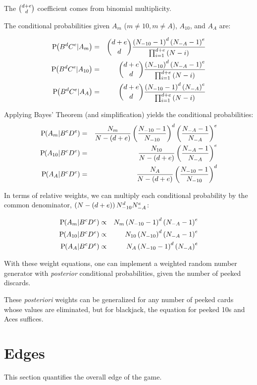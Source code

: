 \noindent
The $\binom{d+e}{d}$ coefficient comes from binomial multiplicity.

\noindent
The conditional probabilities given $A_m$ ($m\neq{}10,m\neq{}A$), 
$A_{10}$, and $A_A$ are:

\begin{eqnarray}
\textrm{P}\hspace{-.5ex}\left(B^d C^e|A_m\right) &=& \binom{d+e}{d} \frac{\left(N_{-10}-1\right)^d \left(N_{-A}-1\right)^e}{\prod_{i=1}^{d+e}{\left(N-i\right)}}\\
\textrm{P}\hspace{-.5ex}\left(B^d C^e|A_{10}\right) &=& \binom{d+e}{d} \frac{\left(N_{-10}\right)^d \left(N_{-A}-1\right)^e}{\prod_{i=1}^{d+e}{\left(N-i\right)}}\\
\textrm{P}\hspace{-.5ex}\left(B^d C^e|A_A\right) &=& \binom{d+e}{d} \frac{\left(N_{-10}-1\right)^d \left(N_{-A}\right)^e}{\prod_{i=1}^{d+e}{\left(N-i\right)}}
\end{eqnarray}

\noindent
Applying Bayes' Theorem (and simplification) 
yields the conditional probabilities:
\begin{eqnarray}
\textrm{P}\hspace{-.5ex}\left(A_m|B^c D^e\right) &=& \frac{N_m}{N-\left(d+e\right)}
\left(\frac{N_{-10}-1}{N_{-10}}\right)^d
\left(\frac{N_{-A}-1}{N_{-A}}\right)^e\\
\textrm{P}\hspace{-.5ex}\left(A_{10}|B^c D^e\right) &=& \frac{N_{10}}{N-\left(d+e\right)}
\left(\frac{N_{-A}-1}{N_{-A}}\right)^e\\
\textrm{P}\hspace{-.5ex}\left(A_A|B^c D^e\right) &=& \frac{N_A}{N-\left(d+e\right)}
\left(\frac{N_{-10}-1}{N_{-10}}\right)^d
\end{eqnarray}

In terms of relative weights, we can multiply each conditional probability
by the common denominator, $\left(N-\left(d+e\right)\right)N_{-10}^d N_{-A}^e$:

\begin{eqnarray}
\textrm{P}\hspace{-.5ex}\left(A_m|B^c D^e\right) &\propto& N_m \left(N_{-10}-1\right)^d \left(N_{-A}-1\right)^e\\
\textrm{P}\hspace{-.5ex}\left(A_{10}|B^c D^e\right) &\propto& N_{10} \left(N_{-10}\right)^d \left(N_{-A}-1\right)^e\\
\textrm{P}\hspace{-.5ex}\left(A_A|B^c D^e\right) &\propto& N_A \left(N_{-10}-1\right)^d \left(N_{-A}\right)^e
\end{eqnarray}

\noindent
With these weight equations, 
one can implement a weighted random number generator with 
\emph{posterior} conditional probabilities, given the number
of peeked discards.  

These \emph{posteriori} weights can be generalized for any number of
peeked cards whose values are eliminated, but for blackjack, 
the equation for peeked 10s and Aces suffices.  

\section{Edges}
\label{sec:basic:edges}

This section quantifies the overall edge of the game.

